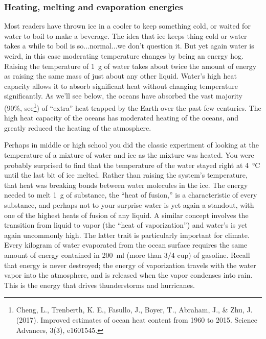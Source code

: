 \documentclass[amstex,12pt]{book}
\begin{document}
\subsubsection{Heating, melting and evaporation energies}\label{water_emp}
Most readers have thrown ice in a cooler to keep something cold, or waited for water to boil to make a beverage. The idea that ice keeps thing cold or water takes a while to boil is so...normal...we don't question it. But yet again water is weird, in this case moderating temperature changes by being an energy hog. Raising the temperature of \SI{1}{\gram} of water takes about twice the amount of energy as raising the same mass of just about any other liquid. Water's high heat capacity allows it to absorb significant heat without changing temperature significantly. As we'll see below, the oceans have absorbed the vast majority (90\%, see\footnote{Cheng, L., Trenberth, K. E., Fasullo, J., Boyer, T., Abraham, J., \& Zhu, J. (2017). Improved estimates of ocean heat content from 1960 to 2015. Science Advances, 3(3), e1601545.}) of ``extra'' heat trapped by the Earth over the past few centuries. The high heat capacity of the oceans has moderated heating of the oceans, and greatly reduced the heating of the atmosphere. 

Perhaps in middle or high school you did the classic experiment of looking at the temperature of a mixture of water and ice as the mixture was heated. You were probably surprised to find that the temperature of the water stayed right at \SI{4}{\degreeCelsius} until the last bit of ice melted. Rather than raising the system's temperature, that heat was breaking bonds between water molecules in the ice. The energy needed to melt \SI{1}{\gram} of substance, the ``heat of fusion,'' is a characteristic of every substance, and perhaps not to your surprise water is yet again a standout, with one of the highest heats of fusion of any liquid. A similar concept involves the transition from liquid to vapor (the ``heat of vaporization'') and water's is yet again uncommonly high. The latter trait is particularly important for climate. Every kilogram of water evaporated from the ocean surface requires the same amount of energy contained in \SI{200}{\milli\litre} (more than $3/4$ cup) of gasoline. Recall that energy is never destroyed; the energy of vaporization travels with the water vapor into the atmosphere, and is released when the vapor condenses into rain. This is the energy that drives thunderstorms and hurricanes.             
\end{document}
